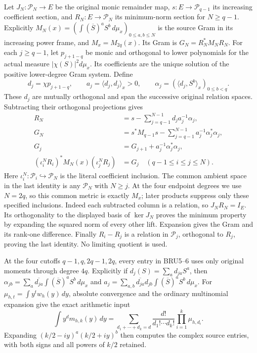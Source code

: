 \documentclass[11pt,a4paper]{article}
\begin{document}
Let $J_N:\mathcal P_N\to E$ be the original monic remainder map,
$s:E\to\mathcal P_{q-1}$ its increasing coefficient section, and
$R_N:E\to\mathcal P_N$ its minimum-norm section for $N\geq q-1$.
Explicitly $M_N(x)=(\int(\overline S)^aS^b\,d\mu_x)_{0\leq a,b\leq N}$
is the source Gram in its increasing power frame, and $M_x=M_{2q}(x)$.
Its Gram is $G_N=R_N^*M_NR_N$. For each $j\geq q-1$, let $p_{j+1-q}$
be monic and orthogonal to lower polynomials for the actual measure
$|\chi(S)|^2d\mu_x$. Its coefficients are the unique solution of the
positive lower-degree Gram system. Define
\[
 d_j=\chi p_{j+1-q},\qquad
 a_j=\langle d_j,d_j\rangle_x>0,\qquad
 \alpha_j=(\langle d_j,S^b\rangle_x)_{0\leq b<q}.
 \tag{BRU5}
\]
These $d_j$ are mutually orthogonal and span the successive original
relation spaces. Subtracting their orthogonal projections gives
\[
 \begin{aligned}
 R_N&=s-\sum_{j=q-1}^{N-1}d_j a_j^{-1}\alpha_j,\\
 G_N&=s^*M_{q-1}s-\sum_{j=q-1}^{N-1}a_j^{-1}\alpha_j^*\alpha_j,\\
 G_j&=G_{j+1}+a_j^{-1}\alpha_j^*\alpha_j,\\
 (\iota_i^N R_i)^*M_N(x)(\iota_j^N R_j)
    &=G_j\quad(q-1\leq i\leq j\leq N).
 \end{aligned}\tag{BRU6}
\]
Here $\iota_i^N:\mathcal P_i\hookrightarrow\mathcal P_N$ is the
literal coefficient inclusion. The common ambient space in the last
identity is any $\mathcal P_N$ with $N\geq j$. At the four endpoint
degrees we use $N=2q$, so this common metric is exactly $M_x$;
later products suppress only these specified inclusions.
Indeed each subtracted column is a relation, so $J_NR_N=I_E$.
Its orthogonality to the displayed basis of $\ker J_N$ proves
the minimum property by expanding the squared norm of every
other lift. Expansion gives the Gram and its rank-one difference.
Finally $R_i-R_j$ is a relation in $\mathcal P_j$, orthogonal
to $R_j$, proving the last identity. No limiting quotient is used.

At the four cutoffs $q-1,q,2q-1,2q$, every entry in BRU5--6 uses
only original moments through degree $4q$. Explicitly if
$d_j(S)=\sum_a d_{ja}S^a$, then
$\alpha_{jb}=\sum_a\overline{d_{ja}}
\int(\overline S)^aS^b\,d\mu_x$ and
$a_j=\sum_{a,b}\overline{d_{ja}}d_{jb}
\int(\overline S)^aS^b\,d\mu_x$.
For $\mu_{h,t}=\int y^t w_h(y)\,dy$, absolute convergence and
the ordinary multinomial expansion give the exact arithmetic input
\[
 \int y^d m_{h,k}(y)\,dy
 =\sum_{d_1+\cdots+d_k=d}\frac{d!}{d_1!\cdots d_k!}
                  \prod_{i=1}^k\mu_{h,d_i}.
 \tag{BRU7}
\]
Expanding $(k/2-iy)^a(k/2+iy)^b$ then computes the complex
source entries, with both signs and all powers of $k/2$ retained.
\end{document}
